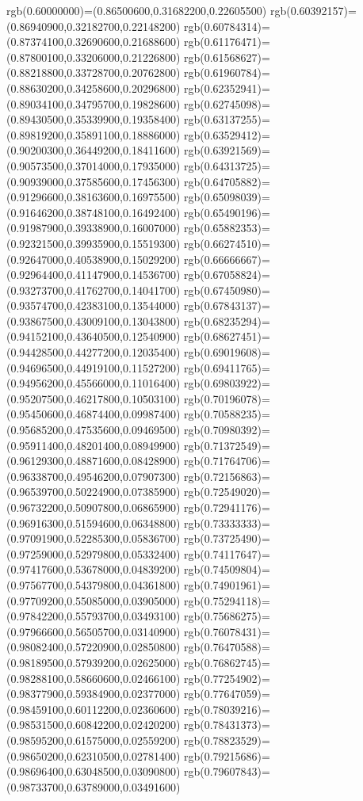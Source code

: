 {{rgb(0.60000000)=(0.86500600,0.31682200,0.22605500)
rgb(0.60392157)=(0.86940900,0.32182700,0.22148200)
rgb(0.60784314)=(0.87374100,0.32690600,0.21688600)
rgb(0.61176471)=(0.87800100,0.33206000,0.21226800)
rgb(0.61568627)=(0.88218800,0.33728700,0.20762800)
rgb(0.61960784)=(0.88630200,0.34258600,0.20296800)
rgb(0.62352941)=(0.89034100,0.34795700,0.19828600)
rgb(0.62745098)=(0.89430500,0.35339900,0.19358400)
rgb(0.63137255)=(0.89819200,0.35891100,0.18886000)
rgb(0.63529412)=(0.90200300,0.36449200,0.18411600)
rgb(0.63921569)=(0.90573500,0.37014000,0.17935000)
rgb(0.64313725)=(0.90939000,0.37585600,0.17456300)
rgb(0.64705882)=(0.91296600,0.38163600,0.16975500)
rgb(0.65098039)=(0.91646200,0.38748100,0.16492400)
rgb(0.65490196)=(0.91987900,0.39338900,0.16007000)
rgb(0.65882353)=(0.92321500,0.39935900,0.15519300)
rgb(0.66274510)=(0.92647000,0.40538900,0.15029200)
rgb(0.66666667)=(0.92964400,0.41147900,0.14536700)
rgb(0.67058824)=(0.93273700,0.41762700,0.14041700)
rgb(0.67450980)=(0.93574700,0.42383100,0.13544000)
rgb(0.67843137)=(0.93867500,0.43009100,0.13043800)
rgb(0.68235294)=(0.94152100,0.43640500,0.12540900)
rgb(0.68627451)=(0.94428500,0.44277200,0.12035400)
rgb(0.69019608)=(0.94696500,0.44919100,0.11527200)
rgb(0.69411765)=(0.94956200,0.45566000,0.11016400)
rgb(0.69803922)=(0.95207500,0.46217800,0.10503100)
rgb(0.70196078)=(0.95450600,0.46874400,0.09987400)
rgb(0.70588235)=(0.95685200,0.47535600,0.09469500)
rgb(0.70980392)=(0.95911400,0.48201400,0.08949900)
rgb(0.71372549)=(0.96129300,0.48871600,0.08428900)
rgb(0.71764706)=(0.96338700,0.49546200,0.07907300)
rgb(0.72156863)=(0.96539700,0.50224900,0.07385900)
rgb(0.72549020)=(0.96732200,0.50907800,0.06865900)
rgb(0.72941176)=(0.96916300,0.51594600,0.06348800)
rgb(0.73333333)=(0.97091900,0.52285300,0.05836700)
rgb(0.73725490)=(0.97259000,0.52979800,0.05332400)
rgb(0.74117647)=(0.97417600,0.53678000,0.04839200)
rgb(0.74509804)=(0.97567700,0.54379800,0.04361800)
rgb(0.74901961)=(0.97709200,0.55085000,0.03905000)
rgb(0.75294118)=(0.97842200,0.55793700,0.03493100)
rgb(0.75686275)=(0.97966600,0.56505700,0.03140900)
rgb(0.76078431)=(0.98082400,0.57220900,0.02850800)
rgb(0.76470588)=(0.98189500,0.57939200,0.02625000)
rgb(0.76862745)=(0.98288100,0.58660600,0.02466100)
rgb(0.77254902)=(0.98377900,0.59384900,0.02377000)
rgb(0.77647059)=(0.98459100,0.60112200,0.02360600)
rgb(0.78039216)=(0.98531500,0.60842200,0.02420200)
rgb(0.78431373)=(0.98595200,0.61575000,0.02559200)
rgb(0.78823529)=(0.98650200,0.62310500,0.02781400)
rgb(0.79215686)=(0.98696400,0.63048500,0.03090800)
rgb(0.79607843)=(0.98733700,0.63789000,0.03491600)
}}
